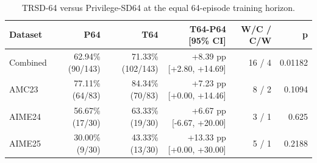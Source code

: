 \begin{table}[t]
\centering
\small
\caption{TRSD-64 versus Privilege-SD64 at the equal 64-episode training horizon.}
\label{tab:trsd64-p64}
\begin{tabular}{lrrrrr}
\toprule
Dataset & P64 & T64 & T64-P64 [95\% CI] & W/C / C/W & p \\
\midrule
Combined & 62.94\% (90/143) & 71.33\% (102/143) & +8.39 pp [+2.80, +14.69] & 16 / 4 & 0.01182 \\
AMC23 & 77.11\% (64/83) & 84.34\% (70/83) & +7.23 pp [+0.00, +14.46] & 8 / 2 & 0.1094 \\
AIME24 & 56.67\% (17/30) & 63.33\% (19/30) & +6.67 pp [-6.67, +20.00] & 3 / 1 & 0.625 \\
AIME25 & 30.00\% (9/30) & 43.33\% (13/30) & +13.33 pp [+0.00, +30.00] & 5 / 1 & 0.2188 \\
\bottomrule
\end{tabular}
\end{table}
